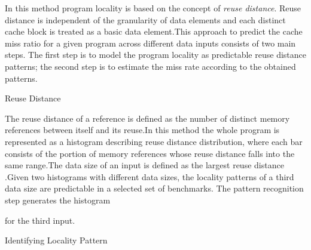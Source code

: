 \documentclass[12pt]{article}
\begin{document}
\vspace{\baselineskip}
\begin{adjustwidth}{0.0in}{0.08in}
{\fontsize{10pt}{12.0pt}\selectfont \textcolor[HTML]{333333}{In this method program locality is based on the concept of \textit{reuse distance}. Reuse distance is independent of the granularity of data elements and each distinct cache block is treated as a basic data element.This approach to predict the cache miss ratio for a given program across different data inputs consists of two main steps. The first step is to model the program locality as predictable reuse distance patterns; the second step is to estimate the miss rate according to the obtained patterns.}\par}\par

\end{adjustwidth}


\vspace{\baselineskip}
{\fontsize{20pt}{24.0pt}\selectfont Reuse Distance\par}\par


\vspace{\baselineskip}

\vspace{\baselineskip}
\begin{adjustwidth}{0.0in}{0.03in}
{\fontsize{11pt}{13.2pt}\selectfont The reuse distance of a reference is defined as the number of distinct memory references between itself and its reuse.In this method the whole program is represented as a histogram describing reuse distance distribution, where each bar consists of the portion of memory references whose reuse distance falls into the same range.The data size of an input is defined as the largest reuse distance .Given two histograms with different data sizes, the locality patterns of a third data size are predictable in a selected set of benchmarks. The pattern recognition step generates the histogram\par}\par

\end{adjustwidth}


\vspace{\baselineskip}
for the third input.\par


\vspace{\baselineskip}

\vspace{\baselineskip}
{\fontsize{17pt}{20.4pt}\selectfont Identifying Locality Pattern\par}\par
\end{document}
